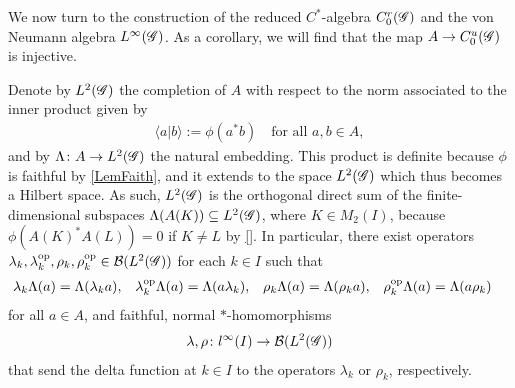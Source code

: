 We now turn to the construction of the reduced $C^{*}$-algebra $C^{r}_{0}(\mathscr{G})$
and the von Neumann algebra $L^{\infty}(\mathscr{G})$. As a corollary, we will find
that the map $A \to C^{u}_{0}(\mathscr{G})$ is injective.

Denote by $L^{2}(\mathscr{G})$ the completion of $A$ with respect to the norm
associated to the inner product given by
\begin{align*}
  \langle a|b\rangle :=\phi(a^{*}b) \quad \text{for all } a,b\in A,
\end{align*}
and by $\Lambda \colon A \to L^{2}(\mathscr{G})$ the natural embedding.  This
product is definite because $\phi$ is faithful by \ref{LemFaith}, and
it extends to the space $L^{2}(\mathscr{G})$ which thus becomes a Hilbert space.
As such, $L^{2}(\mathscr{G})$ is the
orthogonal direct sum of the finite-dimensional subspaces
$\Lambda(A(K)) \subseteq L^{2}(\mathscr{G})$, where $K\in M_{2}(I)$, because
$\phi(A(K)^{*}A(L)) = 0$ if $K\neq L$ by \ref{}.  In particular, there
exist  operators
$\lambda_{k},\lambda_{k}^{\operatorname{\mathrm{op}}},\rho_{k},\rho_{k}^{\operatorname{\mathrm{op}}}\in {\cal
  B}(L^{2}(\mathscr{G}))$ for each $k\in I$ such that
\begin{align*}
  \lambda_{k}\Lambda(a)&= \Lambda(\lambda_{k} a), &
  \lambda^{\operatorname{\mathrm{op}}}_{k}\Lambda(a) &= \Lambda(a\lambda_{k}), &
  \rho_{k}\Lambda(a) &= \Lambda(\rho_{k}a), &
  \rho_{k}^{\operatorname{\mathrm{op}}}\Lambda(a) &= \Lambda(a\rho_{k})
\end{align*}
for all $a\in A$, and faithful, normal $*$-homomorphisms
\begin{align} \label{eq:vn-lambda-rho}
  \lambda,\rho \colon l^{\infty}(I) \to
  {\cal B}(L^{2}(\mathscr{G}))
\end{align}
that send the delta function at
$k\in I$ to the operators $\lambda_{k}$ or $\rho_{k}$, respectively. 

